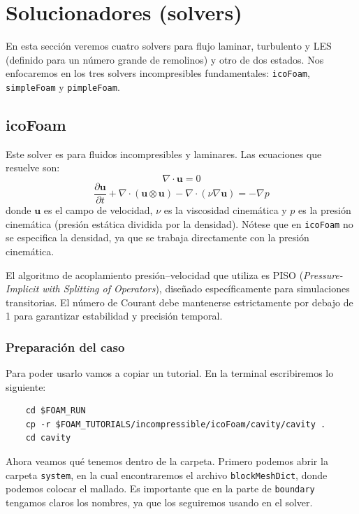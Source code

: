\section{Solucionadores (solvers)}

En esta sección veremos cuatro solvers para flujo laminar, turbulento y LES (definido para un número grande de remolinos) y otro de dos estados. Nos enfocaremos en los tres solvers incompresibles fundamentales: \texttt{icoFoam}, \texttt{simpleFoam} y \texttt{pimpleFoam}.

\subsection{icoFoam}

Este solver es para fluidos incompresibles y laminares. Las ecuaciones que resuelve son:
\[
\nabla \cdot \mathbf{u} = 0
\]
\[
\frac{\partial \mathbf{u}}{\partial t} + \nabla \cdot (\mathbf{u} \otimes \mathbf{u}) - \nabla \cdot (\nu \nabla \mathbf{u}) = -\nabla p
\]
donde $\mathbf{u}$ es el campo de velocidad, $\nu$ es la viscosidad cinemática y $p$ es la presión cinemática (presión estática dividida por la densidad). Nótese que en \texttt{icoFoam} no se especifica la densidad, ya que se trabaja directamente con la presión cinemática.

El algoritmo de acoplamiento presión--velocidad que utiliza es PISO (\textit{Pressure-Implicit with Splitting of Operators}), diseñado específicamente para simulaciones transitorias. El número de Courant debe mantenerse estrictamente por debajo de 1 para garantizar estabilidad y precisión temporal.

\subsubsection*{Preparación del caso}

Para poder usarlo vamos a copiar un tutorial. En la terminal escribiremos lo siguiente:
\begin{verbatim}
    cd $FOAM_RUN
    cp -r $FOAM_TUTORIALS/incompressible/icoFoam/cavity/cavity .
    cd cavity
\end{verbatim}

Ahora veamos qué tenemos dentro de la carpeta. Primero podemos abrir la carpeta \texttt{system}, en la cual encontraremos el archivo \texttt{blockMeshDict}, donde podemos colocar el mallado. Es importante que en la parte de \texttt{boundary} tengamos claros los nombres, ya que los seguiremos usando en el solver.

